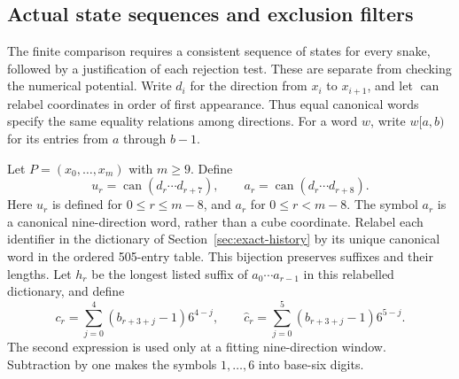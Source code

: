 \documentclass[11pt,a4paper]{article}
\theoremstyle{definition}
\theoremstyle{remark}
\begin{document}
\subsection{Actual state sequences and exclusion filters}\label{sec:state-filter-bridge}
The finite comparison requires a consistent sequence of states for every
snake, followed by a justification of each rejection test. These are separate
from checking the numerical potential. Write $d_i$ for the direction from
$x_i$ to $x_{i+1}$, and let $\operatorname{can}$ relabel coordinates in order of
first appearance. Thus equal canonical words specify the same equality
relations among directions. For a word $w$, write $w[a,b)$ for its entries
from $a$ through $b-1$.

Let $P=(x_0,\ldots,x_m)$ with $m\ge9$. Define
\[
u_r=\operatorname{can}(d_r\cdots d_{r+7}),\qquad
a_r=\operatorname{can}(d_r\cdots d_{r+8}).
\]
Here $u_r$ is defined for $0\le r\le m-8$, and $a_r$ for $0\le r<m-8$.
The symbol $a_r$ is a canonical nine-direction word, rather than a cube
coordinate. Relabel each identifier in the dictionary of
Section~\ref{sec:exact-history} by its unique canonical word in the ordered
505-entry table. This bijection preserves suffixes and their lengths.
Let $h_r$ be the longest listed suffix of $a_0\cdots a_{r-1}$ in this
relabelled dictionary, and define
\[
c_r=\sum_{j=0}^{4}(b_{r+3+j}-1)6^{4-j},\qquad
\widehat c_r=\sum_{j=0}^{5}(b_{r+3+j}-1)6^{5-j}.
\]
The second expression is used only at a fitting nine-direction window.
Subtraction by one makes the symbols $1,\ldots,6$ into base-six digits.
\end{document}
